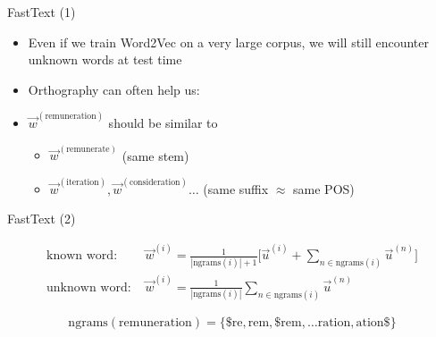 




\begin{vbframe}{FastText (1)}

\vfill

\begin{itemize}
	\item Even if we train Word2Vec on a very large corpus, we will still encounter unknown words at test time
	\item Orthography can often help us:
	\item $\vec w^{(\text{remuneration})}$ should be similar to
		\begin{itemize}
			\item $\vec w^{(\text{remunerate})}$ (same stem)
			\item $\vec w^{(\text{iteration})}, \vec w^{(\text{consideration})} \ldots$ (same suffix $\approx$ same POS)
		\end{itemize}
\end{itemize}

\vfill

\end{vbframe}


\begin{vbframe}{FastText (2)}

\vfill

\begin{align}
\displaystyle
\text{known word:  } & \vec w^{(i)} = \frac{1}{|\mathrm{ngrams}(i)| + 1} \Big[ \vec u^{(i)} + \sum_{n \in \mathrm{ngrams}(i)} \vec u^{(n)} \Big] \nonumber \\
\text{unknown word:  } & \vec w^{(i)} = \frac{1}{|\mathrm{ngrams}(i)|} \sum_{n \in \mathrm{ngrams}(i)} \vec u^{(n)} \nonumber
\end{align}

$$ \mathrm{ngrams}(\text{remuneration}) = \{\text{\$re}, \text{rem}, \text{\$rem}, \ldots  \text{ration}, \text{ation\$}\} $$

\vfill

\end{vbframe}

